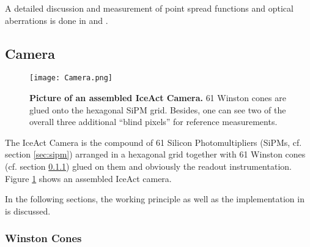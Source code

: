 A detailed discussion and measurement of point spread functions and optical aberrations is done in \cite{famous:niggemann} and \cite{famous:eichler}.

\subsection{Camera}\label{iceact:model:camera}

\begin{figure}
	\centering
	\texttt{[image: Camera.png]}
	\caption[Picture of an assembled IceAct Camera]{\textbf{Picture of an assembled IceAct Camera.} \cite{iceact:camera:burgmann} 61 Winston cones are glued onto the hexagonal SiPM grid. Besides, one can see two of the overall three additional \enquote{blind pixels} for reference measurements.}
	\label{iceact:camera:picture}	
\end{figure}

The IceAct Camera is the compound of 61 Silicon Photomultipliers (SiPMs, cf. section \ref{sec:sipm}) arranged in a hexagonal grid together with 61 Winston cones (cf. section \ref{sec:winstoncones}) glued on them and obviously the readout instrumentation. Figure \ref{iceact:camera:picture} shows an assembled IceAct camera.


In the following sections, the working principle as well as the implementation in \geant is discussed.

\subsubsection{Winston Cones}\label{sec:winstoncones}

